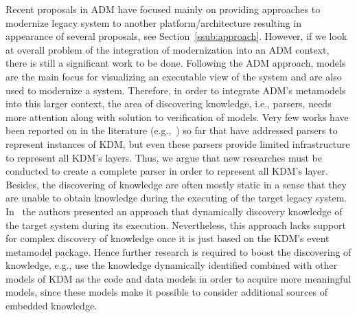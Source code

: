 Recent proposals in ADM have focused mainly on providing approaches to modernize legacy system to another platform/architecture resulting in appearance of several proposals, see Section~\ref{ssub:approach}. However, if we look at overall problem of the integration of modernization into an ADM context, there is still a significant work to be done. Following the ADM approach, models are the main focus for visualizing an executable view of the system and are also used to modernize a system. Therefore, in order to integrate ADM's metamodels into this larger context, the area of discovering knowledge, i.e., parsers, needs more attention along with solution to verification of models. Very few works have been reported on in the literature (e.g.,~\cite{5440163,Bruneliere:2010:MGE:1858996.1859032}) so far that have addressed parsers to represent instances of KDM, but even these parsers provide limited infrastructure to represent all KDM's layers. Thus, we argue that new researches must be conducted to create a complete parser in order to represent all KDM's layer. Besides, the discovering of knowledge are often mostly static in a sense that they are unable to obtain knowledge during the executing of the target legacy system. In~\cite{5871783} the authors presented an approach that dynamically discovery knowledge of the target system during its execution. Nevertheless, this approach lacks support for complex discovery of knowledge once it is just based on the KDM's event metamodel package. Hence further research is required to boost the discovering of knowledge, e.g., use the knowledge dynamically identified combined with other models of KDM as the code and data models in order to acquire more meaningful models, since these models make it possible to consider additional sources of embedded knowledge.

